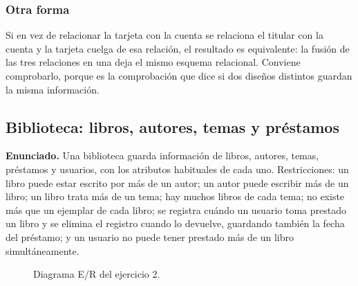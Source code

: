 \subsubsection*{Otra forma}

Si en vez de relacionar la tarjeta con la cuenta se relaciona el titular con la
cuenta y la tarjeta cuelga de esa relación, el resultado es equivalente: la
fusión de las tres relaciones en una deja el mismo esquema relacional. Conviene
comprobarlo, porque es la comprobación que dice si dos diseños distintos
guardan la misma información.

\subsection{Biblioteca: libros, autores, temas y préstamos}

\textbf{Enunciado.} Una biblioteca guarda información de libros, autores, temas,
préstamos y usuarios, con los atributos habituales de cada uno. Restricciones:
un libro puede estar escrito por más de un autor; un autor puede escribir más de
un libro; un libro trata más de un tema; hay muchos libros de cada tema; no
existe más que un ejemplar de cada libro; se registra cuándo un usuario toma
prestado un libro y se elimina el registro cuando lo devuelve, guardando también
la fecha del préstamo; y un usuario no puede tener prestado más de un libro
simultáneamente.

\begin{figure}[H]
\centering
{}
\caption{Diagrama E/R del ejercicio 2.}
\end{figure}

